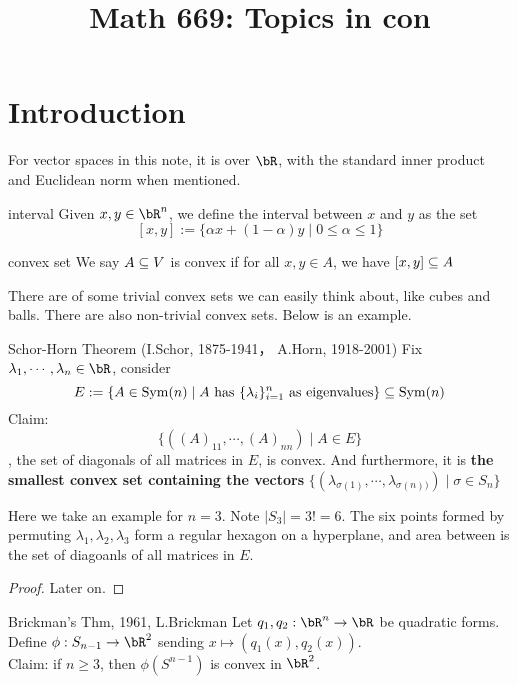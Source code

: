\documentclass[lang=cn,11pt]{elegantbook}
\title{Math 669: Topics in con}
\begin{document}
\frontmatter
\tableofcontents
\mainmatter

\chapter{Introduction}

\noindent For vector spaces in this note, it is over $\bR$, with the standard inner product and Euclidean norm when mentioned.

\begin{definition}{interval}
    Given $x,y \in \bR^n$, we define the interval between $x$ and $y$ as the set 
    $$
    [x,y] := \{ \alpha x + (1-\alpha)y \mid 0 \leq \alpha \leq 1  \}
    $$
\end{definition}

\begin{definition}{convex set}
    We say $A \subseteq V$ is convex if for all $x,y \in A$, we have $[x,y] \subseteq A$
\end{definition}

There are of some trivial convex sets we can easily think about, like cubes and balls. There are also non-trivial convex sets. Below is an example.
\begin{example}
\begin{theorem}{Schor-Horn Theorem (I.Schor, 1875-1941， A.Horn, 1918-2001)}
\label{Schor-Horn Theorem}
Fix $\lambda_1, \cdots, \lambda_n \in \bR$, consider 
$$
E := \{ A \in \operatorname{Sym}(n) \mid A \text{ has } \{\lambda_i\}_{i=1}^n \text{ as eigenvalues} \} \subseteq \operatorname{Sym}(n)
$$
Claim:
$$
\{ ((A)_{11}, \cdots, (A)_{nn}) \mid A \in E   \}
$$
, the set of diagonals of all matrices in $E$, is convex. And furthermore, it is \textbf{the smallest convex set containing the vectors} $\{ ( \lambda_{\sigma(1)}, \cdots,  \lambda_{\sigma(n))}) \mid \sigma \in S_n  \}$
\end{theorem}
\noindent Here we take an example for $n=3$. Note $|S_3| = 3! = 6$. The six points formed by permuting $\lambda_1, \lambda_2, \lambda_3$ form a regular hexagon on a hyperplane, and area between is the set of diagoanls of all matrices in $E$.
\begin{proof}
    Later on.
\end{proof}
\end{example}

\begin{example}
\begin{theorem}{Brickman's Thm, 1961, L.Brickman}\label{Brickman's Thm}
Let $q_1, q_2: \bR^n \rar \bR$ be quadratic forms.\\
Define $\phi: S_{n-1} \rar \bR^2$ sending $x \mapsto (q_1(x), q_2(x))$.\\
Claim: if $n \geq 3$, then $\phi(S^{n-1})$ is convex in $\bR^2$.
\end{theorem}


\end{example}
\end{document}
